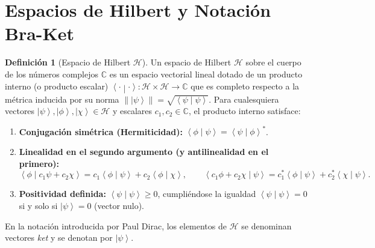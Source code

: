 \documentclass[11pt,a4paper,twoside]{report}
\theoremstyle{definition}
\newtheorem{definicion}{Definición}[chapter]
\theoremstyle{plain}
\theoremstyle{remark}
\newcommand{\ket}[1]{\left| #1 \right\rangle}
\newcommand{\braket}[2]{\left\langle #1 \middle| #2 \right\rangle}
\newcommand{\Hil}{\mathcal{H}}
\begin{document}
\section{Espacios de Hilbert y Notación Bra-Ket}

\begin{definicion}[Espacio de Hilbert $\Hil$]
Un espacio de Hilbert $\Hil$ sobre el cuerpo de los números complejos $\mathbb{C}$ es un espacio vectorial lineal dotado de un producto interno (o producto escalar) $\braket{\cdot}{\cdot}: \Hil \times \Hil \to \mathbb{C}$ que es completo respecto a la métrica inducida por su norma $\|\ket{\psi}\| = \sqrt{\braket{\psi}{\psi}}$. Para cualesquiera vectores $\ket{\psi}, \ket{\phi}, \ket{\chi} \in \Hil$ y escalares $c_1, c_2 \in \mathbb{C}$, el producto interno satisface:
\begin{enumerate}[label=\roman*)]
    \item \textbf{Conjugación simétrica (Hermiticidad):} $\braket{\phi}{\psi} = \braket{\psi}{\phi}^*$.
    \item \textbf{Linealidad en el segundo argumento (y antilinealidad en el primero):}
    \begin{equation}
        \braket{\phi}{c_1 \psi + c_2 \chi} = c_1 \braket{\phi}{\psi} + c_2 \braket{\phi}{\chi}, \qquad \braket{c_1 \phi + c_2 \chi}{\psi} = c_1^* \braket{\phi}{\psi} + c_2^* \braket{\chi}{\psi}.
    \end{equation}
    \item \textbf{Positividad definida:} $\braket{\psi}{\psi} \ge 0$, cumpliéndose la igualdad $\braket{\psi}{\psi} = 0$ si y solo si $\ket{\psi} = 0$ (vector nulo).
\end{enumerate}
En la notación introducida por Paul Dirac, los elementos de $\Hil$ se denominan vectores \textit{ket} y se denotan por $\ket{\psi}$.
\end{definicion}
\end{document}
